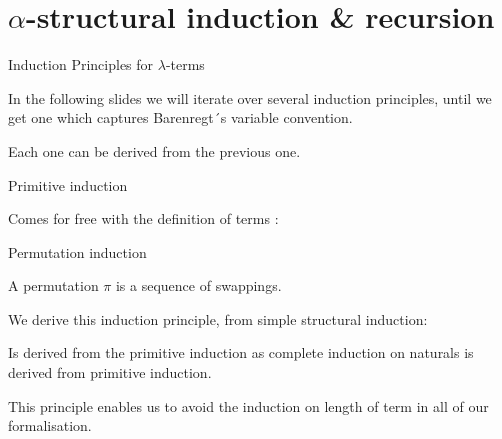\documentclass[utf,utf8x,hyperref=hidelinks,xcolor=table]{beamer} %
\begin{document}
\section{$\alpha$-structural induction \& recursion}

\begin{frame}{Induction Principles for $\lambda$-terms}

In the following slides we will iterate over several induction principles, until we get one which captures Barenregt´s variable convention.

\pause

\bigskip

Each one can be derived from the previous one.

\end{frame}


\begin{frame}{Primitive induction}

  Comes for free with the definition of terms : \bigskip

\end{frame}


\begin{frame}{Permutation induction}

A permutation $\pi$ is a sequence of swappings.
 
\bigskip
\pause

\bigskip

We derive this induction principle, from simple structural induction:

 \bigskip


\bigskip
\pause
Is derived from the primitive induction as complete induction on naturals is derived from primitive induction.

\bigskip
\pause
This principle enables us to avoid the induction on length of term in all of our formalisation.


\end{frame}

\end{document}
